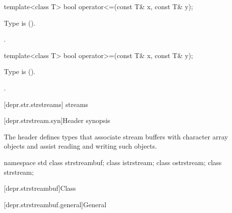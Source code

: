 %
\begin{itemdecl}
template<class T> bool operator<=(const T& x, const T& y);
\end{itemdecl}

\begin{itemdescr}
\pnum
\requires
Type  is  ().

\pnum
\returns
{}.
\end{itemdescr}

%
\begin{itemdecl}
template<class T> bool operator>=(const T& x, const T& y);
\end{itemdecl}

\begin{itemdescr}
\pnum
\requires
Type  is  ().

\pnum
\returns
{}.
\end{itemdescr}

[depr.str.strstreams]{ streams}

[depr.strstream.syn]{Header  synopsis}

\pnum
The header 
defines types that associate stream buffers with
character array objects and assist reading and writing such objects.

\begin{codeblock}
namespace std {
  class strstreambuf;
  class istrstream;
  class ostrstream;
  class strstream;
}
\end{codeblock}

[depr.strstreambuf]{Class }

[depr.strstreambuf.general]{General}

